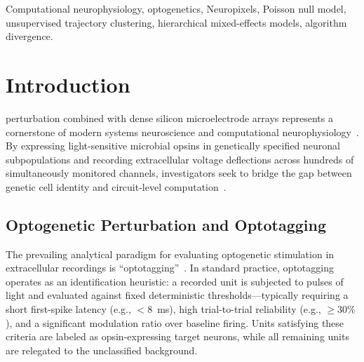 \documentclass[10pt,journal,compsoc]{IEEEtran}
\begin{document}
{\begin{IEEEkeywords}
Computational neurophysiology, optogenetics, Neuropixels, Poisson null model, unsupervised trajectory clustering, hierarchical mixed-effects models, algorithm divergence.
\end{IEEEkeywords}}

\maketitle
\IEEEdisplaynontitleabstractindextext
\IEEEpeerreviewmaketitle

\section{Introduction}
 perturbation combined with dense silicon microelectrode arrays represents a cornerstone of modern systems neuroscience and computational neurophysiology~\cite{boyden2005millisecond,deisseroth2011optogenetics,jun2017fully,steinmetz2021neuropixels}. By expressing light-sensitive microbial opsins in genetically specified neuronal subpopulations and recording extracellular voltage deflections across hundreds of simultaneously monitored channels, investigators seek to bridge the gap between genetic cell identity and circuit-level computation~\cite{lima2009labeled,kvitsiani2013distinct,cardin2009driving,sohal2009parvalbumin,siegle2021survey}.

\subsection{Optogenetic Perturbation and Optotagging}
The prevailing analytical paradigm for evaluating optogenetic stimulation in extracellular recordings is ``optotagging''~\cite{lima2009labeled,hangya2015central}. In standard practice, optotagging operates as an identification heuristic: a recorded unit is subjected to pulses of light and evaluated against fixed deterministic thresholds—typically requiring a short first-spike latency (e.g., $<8$~ms), high trial-to-trial reliability (e.g., $\ge 30\%$), and a significant modulation ratio over baseline firing. Units satisfying these criteria are labeled as opsin-expressing target neurons, while all remaining units are relegated to the unclassified background.
\end{document}
